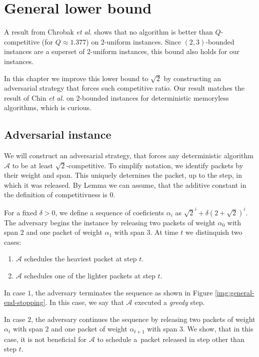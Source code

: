 \def\A{\mathcal{A}}

\chapter{General lower bound}

A result from Chrobak \emph{et al.} \cite{CHROBAK2004204} shows that no
algorithm is better than $Q$\nobreakdash-competitive (for $Q \approx 1.377$) on $2$-uniform instances.
Since $(2,3)$-bounded instances are a superset of $2$-uniform instances, this
bound also holds for our instances.

In this chapter we improve this lower bound to $\sqrt{2}$ by constructing an
adversarial strategy that forces such competitive ratio. Our result matches the
result of Chin \emph{et al.} \cite{CHIN2006255} on $2$-bounded instances for
deterministic memoryless algorithms, which is curious.

\section{Adversarial instance}

We will construct an adversarial strategy, that forces any deterministic
algorithm $\A$ to be at least $\sqrt{2}$-competitive. To simplify notation, we
identify packets by their weight and span. This uniquely deternines the packet,
up to the step, in which it was released. By Lemma  we can assume,
that the additive constant in the definition of competitivness is $0$.

For a fixed $\delta > 0$, we define a sequence of coeficients $\alpha_i$ as
$\sqrt{2}^i + \delta (2 + \sqrt{2})^i$. The adversary begins the instance by
releasing two packets of weight $\alpha_0$ with span $2$ and one packet of
weight $\alpha_1$ with span $3$. At time $t$ we distinquish two cases:

 \begin{enumerate}
    \item $\A$ schedules the heaviest packet at step $t$.
    \item $\A$ schedules one of the lighter packets at step $t$.
\end{enumerate}

In case $1$, the adversary terminates the sequence as shown in Figure
\ref{img:general-end-stopping}. In this case, we say that $\A$ executed a
\emph{greedy} step.

In case $2$, the adversary continues the sequence by releasing two packets of
weight $\alpha_t$ with span $2$ and one packet of weight $\alpha_{t+1}$ with
span $3$. We show, that in this case, it is not beneficial for $\A$ to schedule
a~packet released in step other than step $t$.


